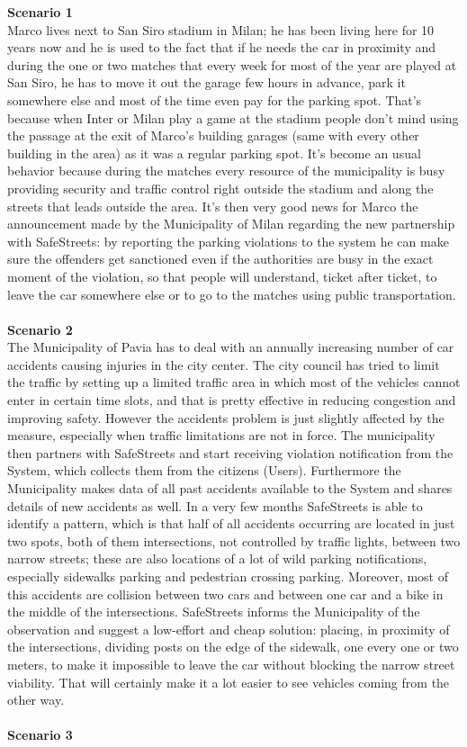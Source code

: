 \documentclass {article}
\begin{document}
		{\bf Scenario 1}\\
		Marco lives next to San Siro stadium in Milan; he has been living here for 10 years now and he is used to the fact that if he needs the car in proximity and during the one or two matches that every week for most of the year are played at San Siro, he has to move it out the garage few hours in advance, park it somewhere else and most of the time even pay for the parking spot. That’s because when Inter or Milan play a game at the stadium people don’t mind using the passage at the exit of Marco’s building garages (same with every other building in the area) as it was a regular parking spot. It’s become an usual behavior because during the matches every resource of the municipality is busy providing security and traffic control right outside the stadium and along the streets that leads outside the area. It’s then very good news for Marco the announcement made by the Municipality of Milan regarding the new partnership with SafeStreets: by reporting the parking violations to the system he can make sure the offenders get sanctioned even if the authorities are busy in the exact moment of the violation, so that people will understand, ticket after ticket, to leave the car somewhere else or to go to the matches using public transportation.\\ \\
		{\bf Scenario 2}\\
		The Municipality of Pavia has to deal with an annually increasing number of car accidents causing injuries in the city center. The city council has tried to limit the traffic by setting up a limited traffic area in which most of the vehicles cannot enter in certain time slots, and that is pretty effective in reducing congestion and improving safety. However the accidents problem is just slightly affected by the measure, especially when traffic limitations are not in force. The municipality then partners with SafeStreets and start receiving violation notification from the System, which collects them from the citizens (Users). Furthermore the Municipality makes data of all past accidents available to the System and shares details of new accidents as well. In a very few months SafeStreets is able to identify a pattern, which is that half of all accidents occurring are located in just two spots, both of them intersections, not controlled by traffic lights, between two narrow streets; these are also locations of a lot of wild parking notifications, especially sidewalks parking and pedestrian crossing parking. Moreover, most of this accidents are collision between two cars and between one car and a bike in the middle of the intersections. SafeStreets informs the Municipality of the observation and suggest a low-effort and cheap solution: placing, in proximity of the intersections, dividing posts on the edge of the sidewalk, one every one or two meters, to make it impossible to leave the car without blocking the narrow street viability. That will certainly make it a lot easier to see vehicles coming from the other way.\\ \\
		{\bf Scenario 3}
		
\end{document}
